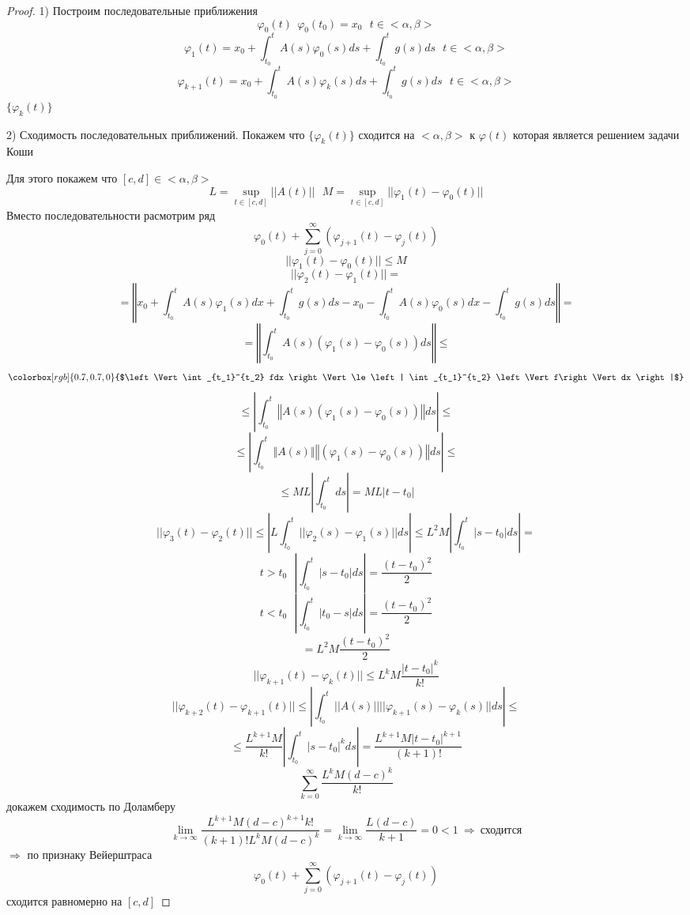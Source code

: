 \begin{proof}
  1) Построим последовательные приближения
  $$
  \varphi_0(t) ~~ \varphi_0(t_0) = x_0 ~~~ t \in <\alpha, \beta>
  $$
  $$
  \varphi_1(t) = x_0 + \int_{t_0}^t A(s) \varphi_0(s)ds + \int_{t_0}^t g(s) ds
  ~~~ t \in <\alpha, \beta>
  $$
  $$
  \varphi_{k+1}(t) = x_0 + \int_{t_0}^t A(s) \varphi_k(s)ds +
  \int_{t_0}^t g(s)ds ~~~ t \in <\alpha, \beta>
  $$
  $\{\varphi_k(t)\}$

  2) Сходимость последовательных приближений. Покажем что $\{\varphi_k(t)\}$
  сходится на $<\alpha, \beta>$ к $\varphi(t)$ которая является решением задачи
  Коши

  Для этого покажем что $[c,d] \in <\alpha, \beta>$
  $$
  L = \sup_{t \in [c,d]} ||A(t)|| ~~~ M = \sup_{t \in [c,d]} ||\varphi_1(t) -
  \varphi_0(t)||
  $$
  Вместо последовательности расмотрим ряд
  $$
  \varphi_0(t) + \sum_{j=0}^{\infty}(\varphi_{j+1}(t) - \varphi_j(t))
  $$
  $$
  ||\varphi_1(t) - \varphi_0(t)|| \le M
  $$
  $$
  ||\varphi_2(t) - \varphi_1(t)|| =
  $$
  $$
  = \left\Vert x_0 + \int_{t_0}^t A(s)\varphi_1(s)dx +
  \int_{t_0}^t g(s)ds - x_0 - \int_{t_0}^t A(s)\varphi_0(s)dx -
  \int_{t_0}^t g(s)ds\right\Vert =
  $$
  $$
  = \left\Vert \int_{t_0}^t A(s)(\varphi_1(s) - \varphi_0(s))ds\right\Vert \le
  $$
  $$
  \colorbox[rgb]{0.7,0.7,0}{$\left\Vert \int_{t_1}^{t_2} fdx \right\Vert
  \le \left| \int_{t_1}^{t_2} \left\Vert f\right\Vert dx \right|$}
  $$
  $$
  \le \left| \int_{t_0}^t \left\Vert A(s)(\varphi_1(s) - \varphi_0(s))
  \right\Vert ds \right| \le
  $$
  $$
  \le \left| \int_{t_0}^t \left\Vert A(s)\right\Vert
  \left\Vert (\varphi_1(s) - \varphi_0(s)) \right\Vert ds \right| \le
  $$
  $$
  \le ML \left| \int_{t_0}^{t} ds \right| = ML|t-t_0|
  $$
  $$
  ||\varphi_3(t) - \varphi_2(t)|| \le \left| L \int_{t_0}^t||\varphi_2(s) -
  \varphi_1(s)||ds \right| \le L^2 M \left| \int_{t_0}^t |s - t_0| ds \right| =
  $$
  $$
  t > t_0 ~~~ \left| \int_{t_0}^t |s - t_0| ds \right| = \frac{(t- t_0)^2}{2}
  $$
  $$
  t < t_0 ~~~ \left| \int_{t_0}^t |t_0 - s| ds \right| = \frac{(t- t_0)^2}{2}
  $$
  $$
  = L^2 M \frac{(t- t_0)^2}{2}
  $$
  $$
  ||\varphi_{k+1}(t) - \varphi_k(t)|| \le L^k M \frac{|t - t_0|^k}{k!}
  $$
  $$
  ||\varphi_{k+2}(t) - \varphi_{k+1}(t)|| \le \left| \int_{t_0}^t ||A(s)||
  ||\varphi_{k+1}(s) - \varphi_k(s)|| ds \right| \le
  $$
  $$
  \le \frac{L^{k+1}M}{k!} \left| \int_{t_0}^t |s - t_0|^k ds \right| =
  \frac{L^{k+1}M|t-t_0|^{k+1}}{(k+1)!}
  $$
  $$
  \sum_{k=0}^{\infty} \frac{L^kM(d - c)^k}{k!}
  $$
  докажем сходимость по Доламберу
  $$
  \lim_{k \to \infty} \frac{L^{k+1} M(d - c)^{k+1}k!}{(k+1)!L^k M (d - c)^k} =
  \lim_{k \to \infty} \frac{L(d-c)}{k+1} = 0 < 1 ~ \Rightarrow ~
  \text{сходится}
  $$
  $\Rightarrow$ по признаку Вейерштраса
  $$
  \varphi_0(t) + \sum_{j=0}^{\infty}(\varphi_{j+1}(t) - \varphi_j(t))
  $$
  сходится равномерно на $[c,d]$


\end{proof}
